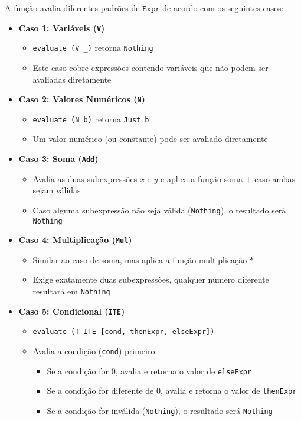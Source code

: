 \documentclass[11pt, a4paper, fleqn]{article}
\begin{document}
A função avalia diferentes padrões de $\mathtt{Expr}$ de acordo com os seguintes casos:

\begin{itemize}
    \item \textbf{Caso 1: Variáveis (\texttt{V})}
    \begin{itemize}
        \item \texttt{evaluate (V \_)} retorna \texttt{Nothing}
        \item Este caso cobre expressões contendo variáveis que não podem ser avaliadas diretamente
    \end{itemize}

    \item \textbf{Caso 2: Valores Numéricos (\texttt{N})}
    \begin{itemize}
        \item \texttt{evaluate (N b)} retorna \texttt{Just b}
        \item Um valor numérico (ou constante) pode ser avaliado diretamente
    \end{itemize}

    \item \textbf{Caso 3: Soma (\texttt{Add})}
    \begin{itemize}
        \item Avalia as duas subexpressões \(x\) e \(y\) e aplica a função soma \(+\) caso ambas sejam válidas
        \item Caso alguma subexpressão não seja válida (\texttt{Nothing}), o resultado será \texttt{Nothing}
    \end{itemize}

    \item \textbf{Caso 4: Multiplicação (\texttt{Mul})}
    \begin{itemize}
        \item Similar ao caso de soma, mas aplica a função multiplicação \(*\)
        \item Exige exatamente duas subexpressões, qualquer número diferente resultará em \texttt{Nothing}
    \end{itemize}

    \item \textbf{Caso 5: Condicional (\texttt{ITE})}
    \begin{itemize}
        \item \texttt{evaluate (T ITE [cond, thenExpr, elseExpr])}
        \item Avalia a condição (\texttt{cond}) primeiro:
        \begin{itemize}
            \item Se a condição for \(0\), avalia e retorna o valor de \texttt{elseExpr}
            \item Se a condição for diferente de \(0\), avalia e retorna o valor de \texttt{thenExpr}
            \item Se a condição for inválida (\texttt{Nothing}), o resultado será \texttt{Nothing}
        \end{itemize}
    \end{itemize}


\end{itemize}
\end{document}
